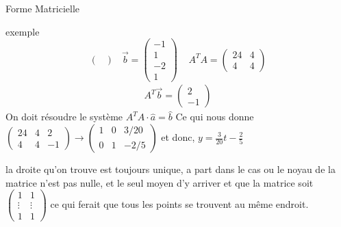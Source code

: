 \begin{parag}{Forme Matricielle}
\begin{subparag}{exemple}
\[\begin{pmatrix}
                \end{pmatrix} \; \; \; \vec{b} = \begin{pmatrix}
                    -1 \\ 1 \\-2\\ 1
                \end{pmatrix} \; \; \; \; A^T A= \begin{pmatrix}
                    24 & 4 \\ 4 & 4
                \end{pmatrix}\]
                \begin{align*}
                    A^T \vec{b} = \begin{pmatrix}
                        2 \\ -1
                    \end{pmatrix}
                \end{align*}
                On doit résoudre le système $A^TA \cdot \hat{a} = \hat{b} $
                Ce qui nous donne
                $\left(
                \begin{array}{cc|c}
                    24 &4 & 2  \\
                     4&4 & -1 
                \end{array}\right) \to \left(
                \begin{array}{cc|c}
                    1 &0 & 3/20  \\
                     0&1 & -2/5 
                \end{array}\right) $ et donc, $y = \frac{3}{20}t - \frac{2}{5}$
            \end{subparag}
            \begin{framedremark}
                la droite qu'on trouve est toujours unique, a part dans le cas ou le noyau de la matrice n'est pas nulle, et le seul moyen d'y arriver et que la matrice soit $\begin{pmatrix}
                    1 &1 \\
                    \vdots  & \vdots\\
                    1 & 1
                \end{pmatrix}$ ce qui ferait que tous les points se trouvent au même endroit.
            \end{framedremark}
        \end{parag}
